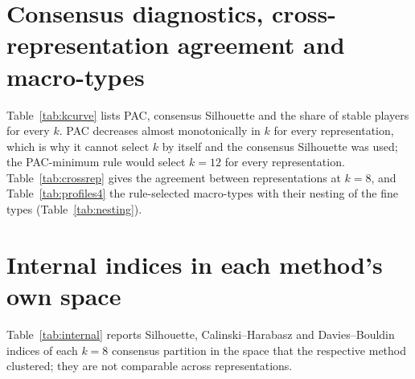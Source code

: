 \section{Consensus diagnostics, cross-representation agreement and macro-types}\label{app:k}
Table~\ref{tab:kcurve} lists PAC, consensus Silhouette and the share of stable players for every $k$. PAC decreases almost monotonically in $k$ for every representation, which is why it cannot select $k$ by itself and the consensus Silhouette was used; the PAC-minimum rule would select $k=12$ for every representation. Table~\ref{tab:crossrep} gives the agreement between representations at $k=8$, and Table~\ref{tab:profiles4} the rule-selected macro-types with their nesting of the fine types (Table~\ref{tab:nesting}).
\begin{table}[h]\centering\small
\caption{Consensus diagnostics by number of clusters $k$ for the summary-statistic representation and the five-seed autoencoder representation.}\label{tab:kcurve}

\end{table}
\begin{table}[h]\centering\small
\caption{Agreement (ARI) between the $k=8$ consensus partitions obtained from different representations of the same \nPlayers{} careers.}
\label{tab:crossrep}

\end{table}
\label{app:nesting}
\begin{table}[h]\centering\scriptsize
\caption{Macro-types ($k=\mainK$, rule-selected) of the summary-statistic consensus. Stability = median player stability; PER, seasons and slope are cluster medians.}
\label{tab:profiles4}
\resizebox{\textwidth}{!}{}
\end{table}
\begin{table}[h]\centering\small
\caption{Cross-tabulation of the eight fine types (rows) against the four macro-types (columns); \nestingPurity\% of players lie in the modal macro-type of their fine type (ARI between the two partitions \ariFourEight).}\label{tab:nesting}

\end{table}

\section{Internal indices in each method's own space}\label{app:internal}
Table~\ref{tab:internal} reports Silhouette, Calinski--Harabasz and Davies--Bouldin indices of each $k=8$ consensus partition in the space that the respective method clustered; they are not comparable across representations.
\begin{table}[h]\centering\small
\caption{Internal indices of the $k=8$ consensus partitions, computed in each representation's own (standardised) space.}\label{tab:internal}

\end{table}
